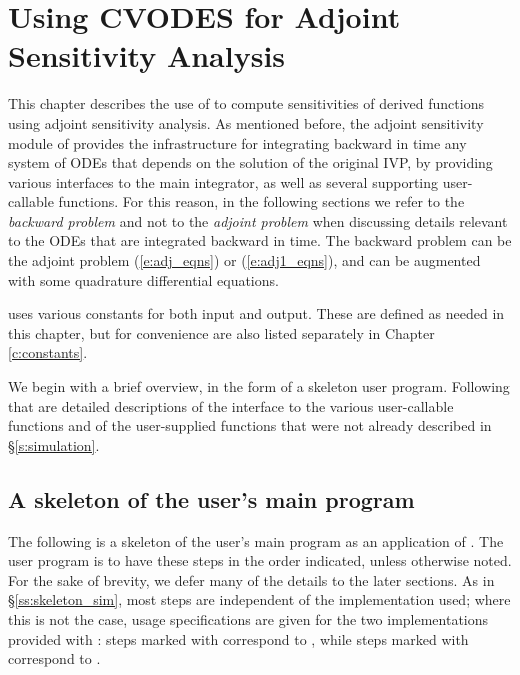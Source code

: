 \chapter{Using CVODES for Adjoint Sensitivity Analysis}\label{s:adjoint}

This chapter describes the use of {\cvodes} to compute sensitivities of derived 
functions using adjoint sensitivity analysis. As mentioned before, the adjoint
sensitivity module of {\cvodes} provides the infrastructure for integrating
backward in time any system of ODEs that depends on the solution of the original
IVP, by providing various interfaces to the main {\cvodes} integrator, as well 
as several supporting user-callable functions. For this reason, in the following
sections we refer to the {\em backward problem} and not to the 
{\em adjoint problem} when discussing details relevant to the ODEs that
are integrated backward in  time. The backward problem can be the adjoint problem
(\ref{e:adj_eqns}) or (\ref{e:adj1_eqns}), and
can be augmented with some quadrature differential equations.

{\cvodes} uses various constants for both input and output.  These are
defined as needed in this chapter, but for convenience are also listed
separately in Chapter \ref{c:constants}.

We begin with a brief overview, in the form of a skeleton user program.
Following that are detailed descriptions of the interface to the
various user-callable functions and of the user-supplied functions that were not already
described in \S\ref{s:simulation}.

\section{A skeleton of the user's main program}
\label{ss:skeleton_adj}

The following is a skeleton of the user's main program as an application of
{\cvodes}. The user program is to have these steps in the order indicated, 
unless otherwise noted. For the sake of brevity, we defer many of the details to 
the later sections.
As in \S\ref{ss:skeleton_sim}, most steps are independent of the {\nvector}
implementation used; where this is not the case, usage specifications are given for the
two implementations provided with {\cvodes}: steps marked with {\p} correspond to 
{\nvecp}, while steps marked with {\s} correspond to {\nvecs}.

